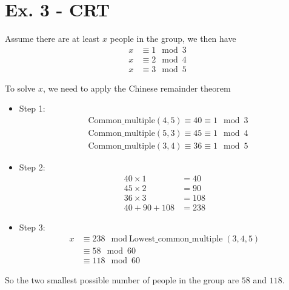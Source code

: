 \documentclass[11pt,a4paper]{article}
\begin{document}
\section*{Ex. 3 - CRT}
\par Assume there are at least $x$ people in the group, we then have
	\begin{align*}
		x &\equiv 1 \mod 3 \\
		x &\equiv 2 \mod 4 \\
		x &\equiv 3 \mod 5
	\end{align*}
\par To solve $x$, we need to apply the Chinese remainder theorem
	\begin{itemize}
		\item Step 1:
			\begin{align*}
				&\mbox{Common\_multiple}(4, 5) \equiv 40 \equiv 1 \mod 3 \\
				&\mbox{Common\_multiple}(5, 3) \equiv 45 \equiv 1 \mod 4 \\
				&\mbox{Common\_multiple}(3, 4) \equiv 36 \equiv 1 \mod 5
			\end{align*}
			
		\item Step 2:
			\begin{align*}
				40 \times 1 &= 40 \\
				45 \times 2 &= 90 \\
				36 \times 3 &= 108 \\
				40 + 90 + 108 &= 238
			\end{align*}
			
		\item Step 3:
			\begin{align*}
				x &\equiv 238 \mod \mbox{Lowest\_common\_multiple} (3, 4 , 5) \\
				&\equiv 58 \mod 60 \\
				&\equiv 118 \mod 60
			\end{align*}
	\end{itemize}
\par So the two smallest possible number of people in the group are $58$ and $118$.
\end{document}
